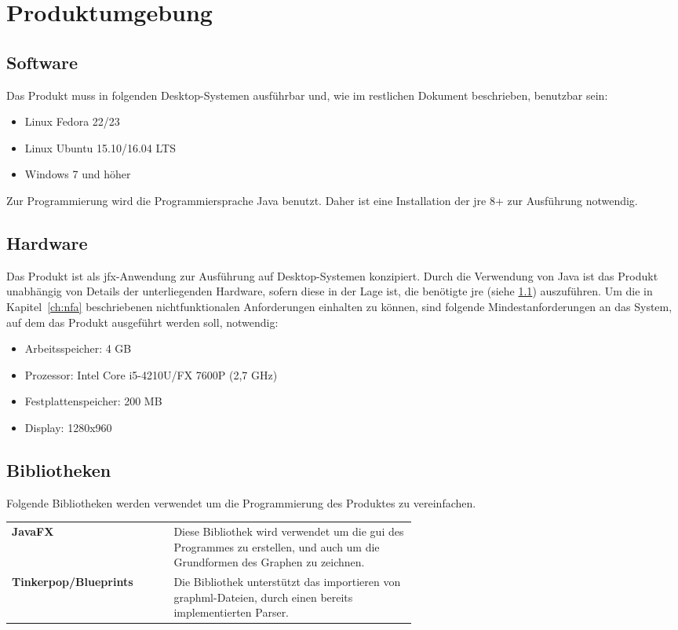 \chapter{Produktumgebung}
\label{ch:umgebung}

\section{Software}\label{sec:software}
Das Produkt muss in folgenden Desktop-Systemen ausführbar und, wie im restlichen Dokument beschrieben, benutzbar sein:
\begin{itemize}
  \setlength\itemsep{0em}
  \item Linux Fedora 22/23 %
  \item Linux Ubuntu 15.10/16.04 LTS
  \item Windows 7 und höher
\end{itemize}
Zur Programmierung wird die Programmiersprache Java benutzt. Daher ist eine Installation der \gls{jre} 8+ zur Ausführung notwendig.

\section{Hardware}\label{sec:hardware}
Das Produkt ist als \gls{jfx}-Anwendung zur Ausführung auf Desktop-Systemen konzipiert.
Durch die Verwendung von Java ist das Produkt unabhängig von Details der unterliegenden Hardware, sofern diese in der Lage ist, die benötigte \gls{jre} (siehe \ref{sec:software}) auszuführen.
Um die in Kapitel~\ref{ch:nfa} beschriebenen nichtfunktionalen Anforderungen einhalten zu können, sind folgende Mindestanforderungen an das System, auf dem das Produkt ausgeführt werden soll, notwendig:

\begin{itemize}
  \setlength\itemsep{0em}
  \item Arbeitsspeicher: 4 GB
  \item Prozessor: Intel Core i5-4210U/FX 7600P (2,7 GHz)
  \item Festplattenspeicher: 200 MB 
  \item Display: 1280x960
\end{itemize}

\section{Bibliotheken}
Folgende Bibliotheken werden verwendet um die Programmierung des Produktes zu vereinfachen. \\

\begin{tabular}{ >{\bfseries}l p{0.6 \linewidth}}
  JavaFX & Diese Bibliothek wird verwendet um die \gls{gui} des Programmes zu erstellen, und auch um die Grundformen des Graphen zu zeichnen. \\
  Tinkerpop/Blueprints & Die Bibliothek unterstützt das importieren von \gls{graphml}-Dateien, durch einen bereits implementierten Parser. \\
\end{tabular}
